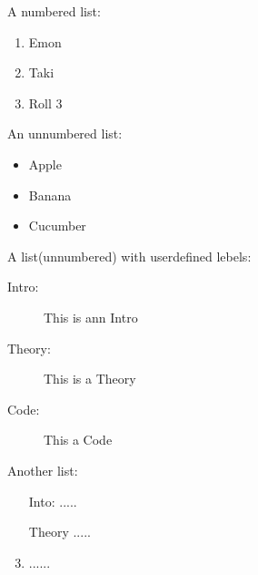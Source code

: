 \documentclass[11pt,a4paper]{article}
\begin{document}
    \vspace{\fill}

A numbered list:
    \begin{enumerate}
        \item Emon
        \item Taki
        \item Roll 3
    \end{enumerate}

    \vspace{\fill}

An unnumbered list:  
    \begin{itemize}
        \item Apple
        \item Banana
        \item Cucumber
    \end{itemize}

    \vspace{\fill}

A list(unnumbered) with userdefined lebels:
    \begin{description}
        \item[Intro:] This is ann Intro
        \item[Theory:] This is a Theory
        \item[Code: ] This a Code   
    \end{description}

    \vspace{\fill}

Another list:
    \begin{enumerate}
        \item [Into:] .....
        \item [Theory] .....
        \setcounter{enumi}{2}
        \renewcommand{\labelenumi}{$\star$} 
        \item ......
    \end{enumerate}
\end{document}
